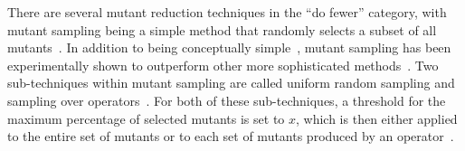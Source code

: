


There are several mutant reduction techniques in the ``do fewer'' category, with mutant sampling being a simple method
that randomly selects a subset of all mutants~\cite{wong1995reducing}. In addition to being conceptually
simple~\cite{gopinath2015mutation}, mutant sampling has been experimentally shown to outperform other more sophisticated
methods~\cite{zhang2010operator}.  Two sub-techniques within mutant sampling are called uniform random sampling and
sampling over operators~\cite{gopinath2015mutation, gopinath2015empirical, Zhang2013}.  For both of these sub-techniques, a
threshold for the maximum percentage of selected mutants is set to $x$, which is then either applied to the entire set
of mutants or to each set of mutants produced by an operator~\cite{gopinath2015mutation, gopinath2015empirical,
Zhang2013}.






